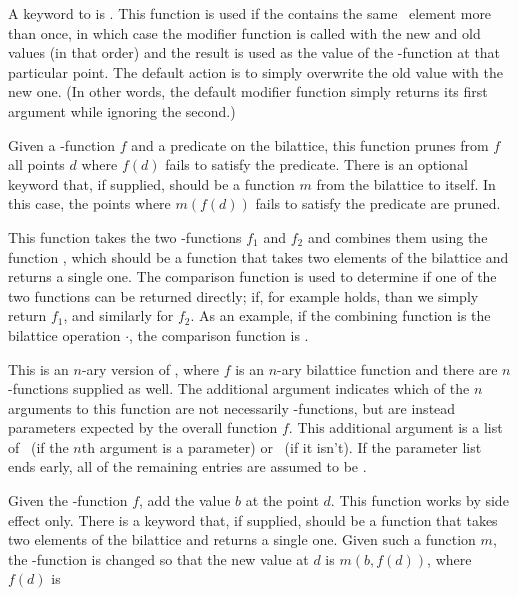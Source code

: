 \begin{description}
A keyword to  is .  This
function is used if the  contains the same \dg\ element
more than once, in which case the modifier function is called with
the new and old values (in that order) and the result is used as the
value of the \dg-function at that particular point.  The default
action is to simply overwrite the old value with the new one.  (In
other words, the default modifier function simply returns its first
argument while ignoring the second.)
 \item [\itype{dag-prune(f pred)}] Given a \dg-function
$f$ and a predicate on the bilattice, this function prunes from $f$
all points $d$ where $f(d)$ fails to satisfy the predicate.  There is
an optional keyword  that, if supplied, should be a
function $m$ from the bilattice to itself.  In this case, the points
where $m(f(d))$ fails to satisfy the predicate are pruned.
 \item [\itype{combine-fns(f1 f2 fn comp)}]
This function takes the two \dg-functions $f_1$ and $f_2$ and
combines them using the function , which should be a
function that takes two elements of the bilattice and returns a
single one.  The comparison function  is used to determine
if one of the two functions can be returned directly; if, for example
 holds, than  we simply return $f_1$, and similarly
for $f_2$.  As an example, if the combining function is the bilattice
operation $\cdot$, the comparison function is .
 \item [\itype{combine-1(f params f1 ... fn)}] This is an
$n$-ary version of , where $f$ is an $n$-ary
bilattice function and there are $n$ \dg-functions supplied as well.
The additional argument  indicates which of the $n$ arguments
to this function are not necessarily \dg-functions, but are instead parameters
expected by the overall function $f$.  This additional argument is a list
of \T\ (if the $n$th argument is a parameter) or \NIL\ (if it isn't).
If the parameter list ends early, all of the remaining entries are
assumed to be \NIL.
 \item [\itype{add-dag(d b f)}] Given the \dg-function
$f$, add the value $b$ at the point $d$.  This function works by side
effect only.  There is a keyword  that, if supplied,
should be a function that takes two elements of the bilattice and
returns a single one.  Given such a function $m$, the \dg-function is
changed so that the new value at $d$ is $m(b,f(d))$, where $f(d)$ is

\end{description}
